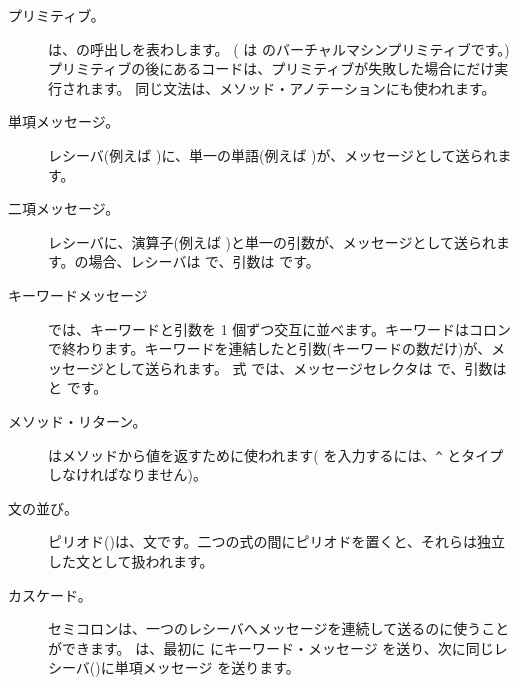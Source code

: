 \documentclass[a4paper,10pt,twoside]{book}
\begin{document}
\begin{description}
\item[プリミティブ。] は、の呼出しを表わします。
	( は のバーチャルマシンプリミティブです。)
	プリミティブの後にあるコードは、プリミティブが失敗した場合にだけ実行されます。
	同じ文法は、メソッド・アノテーションにも使われます。

\item[単項メッセージ。] レシーバ(例えば )に、単一の単語(例えば )が、メッセージとして送られます。

\item[二項メッセージ。] レシーバに、演算子(例えば \ct{+})と単一の引数が、メッセージとして送られます。の場合、レシーバは  で、引数は  です。

\item[キーワードメッセージ] では、キーワードと引数を 1 個ずつ交互に並べます。キーワードはコロンで終わります。キーワードを連結したと引数(キーワードの数だけ)が、メッセージとして送られます。
式  では、メッセージセレクタは  で、引数は  と  です。

\item[メソッド・リターン。] \ct{^}はメソッドから値を返すために使われます(\ct{^} を入力するには、\verb|^| とタイプしなければなりません)。

\item[文の並び。] ピリオド()は、文です。二つの式の間にピリオドを置くと、それらは独立した文として扱われます。

\item[カスケード。] セミコロンは、一つのレシーバへメッセージを連続して送るのに使うことができます。 は、最初に  にキーワード・メッセージ  を送り、次に同じレシーバ()に単項メッセージ  を送ります。

\end{description}
\end{document}
